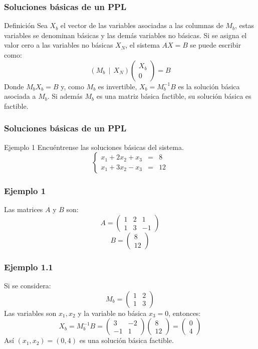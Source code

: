 \documentclass{beamer}
\begin{document}
\begin{frame}
\frametitle{Soluciones b\'asicas de un PPL}
\begin{block}{Definici\'on}
Sea $X_b$ el vector de las variables asociadas a las columnas de $M_b$, estas variables se denominan b\'asicas y las dem\'as variables no b\'asicas. Si se asigna el valor cero a las variables no b\'asicas $X_N$, el sistema $AX=B$ se puede escribir como:
\[(M_b\ \ |\ \ X_N) \left(\begin{array}{c}X_b \\0\end{array}\right) = B\]
Donde $M_bX_b = B$ y, como $M_b$ es invertible, $X_b = M_b^{-1}B$ es la soluci\'on b\'asica asociada a $M_b$. Si adem\'as $M_b$ es una matriz b\'asica factible, su soluci\'on b\'asica es factible.
\end{block}
\end{frame}




\begin{frame}
\frametitle{Soluciones b\'asicas de un PPL}
\begin{block}{Ejemplo 1}
Encu\'entrense las soluciones b\'asicas del sistema.
\[\left\{\begin{array}{ccc}x_1+2x_2+x_3 & = & 8 \\x_1+3x_2-x_3 & = & 12\end{array}\right.\]
\end{block}
\end{frame}




\begin{frame}
\frametitle{Ejemplo 1}
Las matrices $A$ y $B$ son:
\[A=\left(\begin{array}{ccc}1&2&1 \\1&3&-1\end{array}\right)\]
\[B=\left(\begin{array}{c}8 \\12\end{array}\right)\]
\end{frame}




\begin{frame}
\frametitle{Ejemplo 1.1}
Si se considera:
\[M_b=\left(\begin{array}{cc}1&2 \\1&3\end{array}\right)\]
Las variables son $x_1,x_2$ y la variable no b\'asica $x_3=0$, entonces:
\[X_b = M_b^{-1} B= \left(\begin{array}{cc}3&-2 \\-1&1\end{array}\right) \left(\begin{array}{c}8 \\12\end{array}\right) = \left(\begin{array}{c}0 \\4\end{array}\right)\]
As\'i $(x_1,x_2) = (0,4)$ es una soluci\'on b\'asica factible.
\end{frame}
\end{document}
